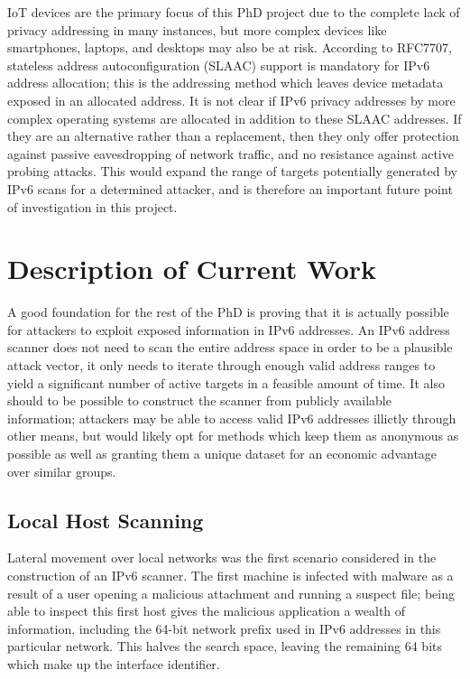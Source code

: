 \documentclass[10pt,sigconf]{acmart}
\begin{document}
IoT devices are the primary focus of this PhD project due to the complete lack of privacy addressing in many instances, but more complex devices like smartphones, laptops, and desktops may also be at risk.
According to RFC7707, stateless address autoconfiguration (SLAAC) support is mandatory for IPv6 address allocation;
this is the addressing method which leaves device metadata exposed in an allocated address.
It is not clear if IPv6 privacy addresses by more complex operating systems are allocated in addition to these SLAAC addresses.
If they are an alternative rather than a replacement, then they only offer protection against passive eavesdropping of network traffic, and no resistance against active probing attacks.
This would expand the range of targets potentially generated by IPv6 scans for a determined attacker, and is therefore an important future point of investigation in this project.




\section{Description of Current Work}


A good foundation for the rest of the PhD is proving that it is actually possible for attackers to exploit exposed information in IPv6 addresses.
An IPv6 address scanner does not need to scan the entire address space in order to be a plausible attack vector, it only needs to iterate through enough valid address ranges to yield a significant number of active targets in a feasible amount of time.
It also should to be possible to construct the scanner from publicly available information; 
attackers may be able to access valid IPv6 addresses illictly through other means, but would likely opt for methods which keep them as anonymous as possible as well as granting them a unique dataset for an economic advantage over similar groups.

\subsection{Local Host Scanning}
Lateral movement over local networks was the first scenario considered in the construction of an IPv6 scanner.
The first machine is infected with malware as a result of a user opening a malicious attachment and running a suspect file;
being able to inspect this first host gives the malicious application a wealth of information, including the 64-bit network prefix used in IPv6 addresses in this particular network.
This halves the search space, leaving the remaining 64 bits which make up the interface identifier.
\end{document}
